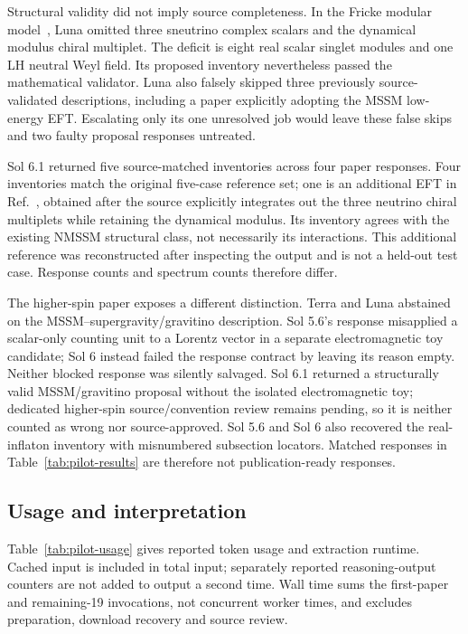 Structural validity did not imply source completeness. In the Fricke modular model~\cite{PilotFricke}, Luna omitted three sneutrino complex scalars and the dynamical modulus chiral multiplet. The deficit is eight real scalar singlet modules and one LH neutral Weyl field. Its proposed inventory nevertheless passed the mathematical validator. Luna also falsely skipped three previously source-validated descriptions, including a paper explicitly adopting the MSSM low-energy EFT. Escalating only its one unresolved job would leave these false skips and two faulty proposal responses untreated.

Sol 6.1 returned five source-matched inventories across four paper responses. Four inventories match the original five-case reference set; one is an additional EFT in Ref.~\cite{PilotFricke}, obtained after the source explicitly integrates out the three neutrino chiral multiplets while retaining the dynamical modulus. Its inventory agrees with the existing NMSSM structural class, not necessarily its interactions. This additional reference was reconstructed after inspecting the output and is not a held-out test case. Response counts and spectrum counts therefore differ.

The higher-spin paper exposes a different distinction. Terra and Luna abstained on the MSSM--supergravity/gravitino description. Sol 5.6's response misapplied a scalar-only counting unit to a Lorentz vector in a separate electromagnetic toy candidate; Sol 6 instead failed the response contract by leaving its reason empty. Neither blocked response was silently salvaged. Sol 6.1 returned a structurally valid MSSM/gravitino proposal without the isolated electromagnetic toy; dedicated higher-spin source/convention review remains pending, so it is neither counted as wrong nor source-approved. Sol 5.6 and Sol 6 also recovered the real-inflaton inventory with misnumbered subsection locators. Matched responses in Table~\ref{tab:pilot-results} are therefore not publication-ready responses.

\subsection{Usage and interpretation}

Table~\ref{tab:pilot-usage} gives reported token usage and extraction runtime. Cached input is included in total input; separately reported reasoning-output counters are not added to output a second time. Wall time sums the first-paper and remaining-19 invocations, not concurrent worker times, and excludes preparation, download recovery and source review.

